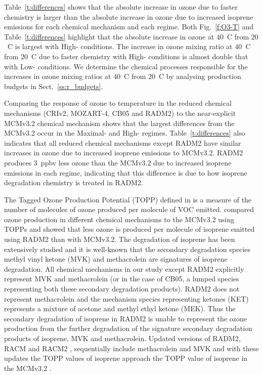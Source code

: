 Table~\ref{t:differences} shows that the absolute increase in ozone due to faster chemistry is larger than the absolute increase in ozone due to increased isoprene emissions for each chemical mechanism and each  regime.
Both Fig.~\ref{f:O3-T} and Table~\ref{t:differences} highlight that the absolute increase in ozone at $40$~\degree C from $20$~\degree C is largest with High- conditions.
The increase in ozone mixing ratio at $40$~\degree C from $20$~\degree C due to faster chemistry with High- conditions is almost double that with Low- conditions.
We determine the chemical processes responsible for the increases in ozone mixing ratios at $40$~\degree C from $20$~\degree C by analysing  production budgets in Sect.~\ref{ss:r_budgets}.

Comparing the response of ozone to temperature in the reduced chemical mechanisms (CRIv2, MOZART-4, CB05 and RADM2) to the near-explicit MCMv3.2 chemical mechanism shows that the largest differences from the MCMv3.2 occur in the Maximal- and High- regimes.
Table~\ref{t:differences} also indicates that all reduced chemical mechanisms except RADM2 have similar increases in ozone due to increased isoprene emissions to MCMv3.2.
RADM2 produces $3$~ppbv less ozone than the MCMv3.2 due to increased isoprene emissions in each  regime, indicating that this difference is due to how isoprene degradation chemistry is treated in RADM2.

The Tagged Ozone Production Potential (TOPP) defined in \citet{Butler:2011} is a measure of the number of molecules of ozone produced per molecule of VOC emitted.
\citet{Coates:2015} compared ozone production in different chemical mechanisms to the MCMv3.2 using TOPPs and showed that less ozone is produced per molecule of isoprene emitted using RADM2 than with MCMv3.2.
The degradation of isoprene has been extensively studied and it is well-known that the secondary degradation species methyl vinyl ketone (MVK) and methacrolein are signatures of isoprene degradation.
All chemical mechanisms in our study except RADM2 explicitly represent MVK and methacrolein (or in the case of CB05, a lumped species representing both these secondary degradation products).
RADM2 does not represent methacrolein and the mechanism species representing ketones (KET) represents a mixture of acetone and methyl ethyl ketone (MEK). 
Thus the secondary degradation of isoprene in RADM2 is unable to represent the ozone production from the further degradation of the signature secondary degradation products of isoprene, MVK and methacrolein.
Updated versions of RADM2, RACM \citep{Stockwell:1997} and RACM2 \citep{Goliff:2013}, sequentially include methacrolein and MVK and with these updates the TOPP values of isoprene approach the TOPP value of isoprene in the MCMv3.2 \citep{Coates:2015}.

